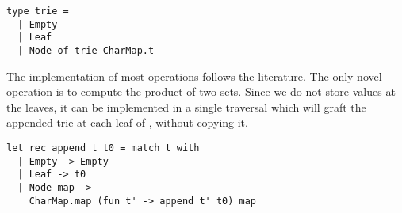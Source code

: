 \begin{lstlisting}
type trie =
  | Empty
  | Leaf
  | Node of trie CharMap.t
\end{lstlisting}

The implementation of most operations follows the literature.
The only novel operation is  to compute the product of two sets.
Since we do not store values at the leaves,
it can be implemented in a single traversal which will graft the appended trie
 at each leaf of , without copying it.

\begin{lstlisting}
let rec append t t0 = match t with
  | Empty -> Empty
  | Leaf -> t0
  | Node map -> 
    CharMap.map (fun t' -> append t' t0) map
\end{lstlisting}

